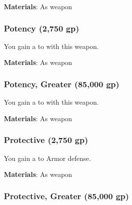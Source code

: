 \vspace{0.25em}
\textbf{Materials}: As weapon


\lowercase{\hypertarget{item:Potency}{}}\label{item:Potency}
\hypertarget{item:Potency}{\subsubsection{Potency\hfill{} (2,750 gp)}}

You gain a   to  with this weapon.



\vspace{0.25em}
\textbf{Materials}: As weapon


\lowercase{\hypertarget{item:Potency, Greater}{}}\label{item:Potency, Greater}
\hypertarget{item:Potency, Greater}{\subsubsection{Potency, Greater\hfill{} (85,000 gp)}}

You gain a   to  with this weapon.



\vspace{0.25em}
\textbf{Materials}: As weapon


\lowercase{\hypertarget{item:Protective}{}}\label{item:Protective}
\hypertarget{item:Protective}{\subsubsection{Protective\hfill{} (2,750 gp)}}

You gain a   to Armor defense.



\vspace{0.25em}
\textbf{Materials}: As weapon


\lowercase{\hypertarget{item:Protective, Greater}{}}\label{item:Protective, Greater}
\hypertarget{item:Protective, Greater}{\subsubsection{Protective, Greater\hfill{} (85,000 gp)}}

